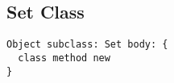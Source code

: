 \subsection {Set Class}

\begin{lstlisting}
Object subclass: Set body: {
  class method new
}
\end{lstlisting}